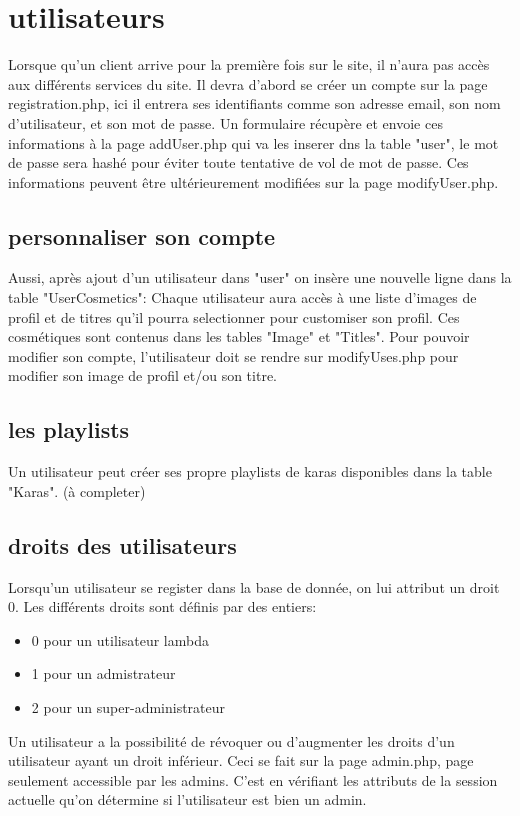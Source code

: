 \section{utilisateurs}

Lorsque qu'un client arrive pour la première fois sur le site, il n'aura pas accès aux différents services du site. Il devra d'abord se créer un compte sur la page registration.php, ici il entrera ses 
identifiants comme son adresse email, son nom d'utilisateur, et son mot de passe. Un formulaire récupère et envoie ces informations à la page addUser.php qui va les inserer dns la table "user", 
le mot de passe sera hashé pour éviter toute tentative de vol de mot de passe.
\newline
Ces informations peuvent être  ultérieurement modifiées sur la page modifyUser.php.\newline

\subsection{personnaliser son compte}

Aussi, après ajout d'un utilisateur dans "user" on insère une nouvelle ligne dans la table "UserCosmetics":  
Chaque utilisateur aura accès à une liste d'images de profil et de titres qu'il pourra selectionner pour customiser son profil. Ces cosmétiques sont contenus dans les tables "Image" et "Titles". 
\newline
Pour pouvoir modifier son compte, l'utilisateur doit se rendre sur modifyUses.php pour modifier son image de profil et/ou son titre.\newline

\subsection{les playlists}

Un utilisateur peut créer ses propre playlists de karas disponibles dans la table "Karas".  (à completer)

\subsection{droits des utilisateurs}
Lorsqu'un utilisateur se register dans la base de donnée, on lui attribut un droit 0. Les différents droits sont définis par des entiers:
\begin{itemize}
	\item 0 pour un utilisateur lambda
	\item 1 pour un admistrateur
	\item 2 pour un super-administrateur
\end{itemize}
Un utilisateur a la possibilité de révoquer ou d'augmenter les droits d'un utilisateur ayant un droit inférieur. Ceci se fait sur la page admin.php, page seulement accessible par les admins. C'est en vérifiant les attributs de la session actuelle qu'on détermine si l'utilisateur est bien un admin.
